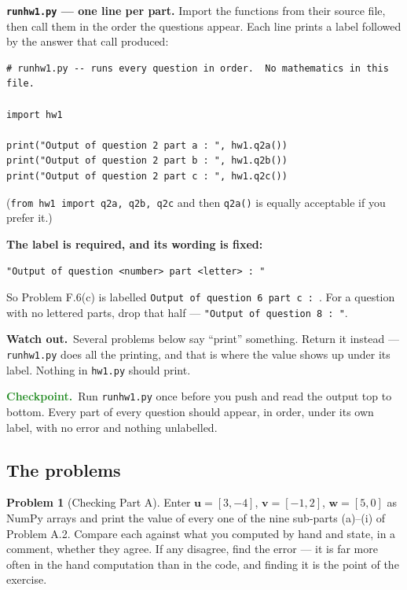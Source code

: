 \documentclass[11pt]{article}
\theoremstyle{definition}
\newtheorem{prob}{Problem}[section]
\newcommand{\heads}[1]{\par\smallskip\noindent
  {\small\sffamily\textcolor{BrickRed}{\textbf{Watch out.}}\ #1}\par\smallskip}
\newcommand{\checkpoint}[1]{\par\smallskip\noindent
  {\small\sffamily\textcolor{ForestGreen}{\textbf{Checkpoint.}}\ #1}\par\smallskip}
\newcommand{\vc}[1]{\mathbf{#1}}
\begin{document}
\noindent\textbf{\texttt{runhw1.py} --- one line per part.} Import the functions
from their source file, then call them in the order the questions appear. Each
line prints a label followed by the answer that call produced:

\begin{lstlisting}
# runhw1.py -- runs every question in order.  No mathematics in this file.

import hw1

print("Output of question 2 part a : ", hw1.q2a())
print("Output of question 2 part b : ", hw1.q2b())
print("Output of question 2 part c : ", hw1.q2c())
\end{lstlisting}

\noindent (\texttt{from hw1 import q2a, q2b, q2c} and then \texttt{q2a()} is
equally acceptable if you prefer it.)

\medskip
\noindent\textbf{The label is required, and its wording is fixed:}

\begin{center}
\texttt{"Output of question <number> part <letter> : "}
\end{center}

\noindent So Problem F.6(c) is labelled \texttt{Output of question 6 part c :}\ .
For a question with no lettered parts, drop that half ---
\texttt{"Output of question 8 : "}.

\heads{Several problems below say ``print'' something. Return it instead ---
\texttt{runhw1.py} does all the printing, and that is where the value shows up
under its label. Nothing in \texttt{hw1.py} should print.}

\checkpoint{Run \texttt{runhw1.py} once before you push and read the output top
to bottom. Every part of every question should appear, in order, under its own
label, with no error and nothing unlabelled.}

\subsection{The problems}

\begin{prob}[Checking Part A]
Enter $\vc{u}=[3,-4]$, $\vc{v}=[-1,2]$, $\vc{w}=[5,0]$ as NumPy arrays and print
the value of every one of the nine sub-parts (a)--(i) of Problem A.2. Compare
each against what you computed by hand and state, in a comment, whether they
agree. If any disagree, find the error --- it is far more often in the hand
computation than in the code, and finding it is the point of the exercise.
\end{prob}
\end{document}
